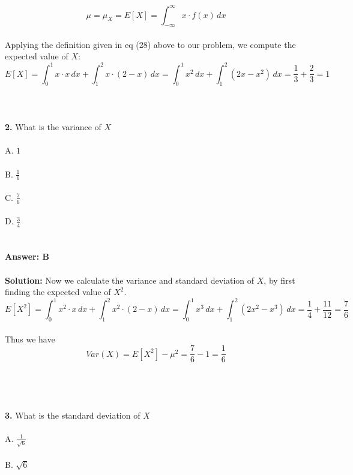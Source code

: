 \documentclass[prl,twocolumn,showpacs,preprintnumbers,superscriptaddress]{revtex4}
\theoremstyle{plain}
\theoremstyle{definition}
\begin{document}
\begin{widetext}
\begin{equation}
    \mu = \mu_{X} = E[X] = \int_{-\infty}^{\infty} x\cdot f(x) \,dx {}\nonumber
\end{equation}
\\
Applying the definition given in eq (28) above to our problem, we compute the expected value of $X$:
\begin{equation}
    E[X] = \int_{0}^{1} x\cdot x  \,dx + \int_{1}^{2} x\cdot (2 - x)  \,dx = \int_{0}^{1} x^2  \,dx + \int_{1}^{2} (2x - x^2)  \,dx = \frac{1}{3} + \frac{2}{3} = 1 {}\nonumber
\end{equation}
\\
\\
\\
\textbf{2.} What is the variance of $X$
\\
\\
\noindent A. $1$\\
\\
B. $\frac{1}{6}$\\
\\
C. $\frac{7}{6}$\\
\\
D. $\frac{3}{4}$
\\
\\
\\
\textbf{Answer: B}
\\
\\
\textbf{Solution:}
Now we calculate the variance and standard deviation of $X$, by first finding the expected value of $X^2$.
\begin{equation}
    E[X^2] = \int_{0}^{1} x^2\cdot x  \,dx + \int_{1}^{2} x^2\cdot (2 - x)  \,dx = \int_{0}^{1} x^3  \,dx + \int_{1}^{2} (2x^2 - x^3)  \,dx = \frac{1}{4} + \frac{11}{12} = \frac{7}{6} {}\nonumber
\end{equation}
\\
Thus we have
\begin{equation}
    Var(X) = E[X^2] - \mu^2 = \frac{7}{6} - 1 = \frac{1}{6} {}\nonumber
\end{equation}
\\
\\
\\
\\
\textbf{3.} What is the standard deviation of $X$
\\
\\
\noindent A. $\frac{1}{\sqrt{6}}$\\
\\
B. $\sqrt{6}$\\
\\

\end{widetext}
\end{document}
